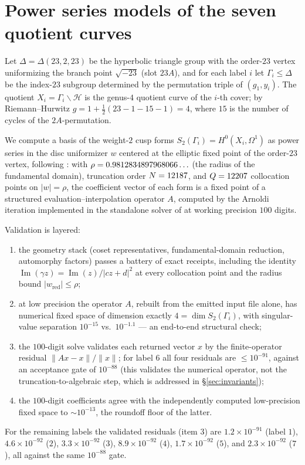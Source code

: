\documentclass[11pt]{amsart}
\newcommand{\sqm}{\sqrt{-23}}
\theoremstyle{plain}
\theoremstyle{definition}
\begin{document}
\section{Power series models of the seven quotient curves}
\label{sec:powser}

Let $\Delta=\Delta(23,2,23)$ be the hyperbolic triangle group with the
order-$23$ vertex uniformizing the branch point $\sqm$ (slot $23A$),
and for each label $i$ let $\Gamma_i\le\Delta$ be the index-$23$
subgroup determined by the permutation triple of $(g_1,y_i)$. The
quotient $X_i=\Gamma_i\backslash\mathcal{H}$ is the genus-$4$ quotient
curve of the $i$-th cover; by Riemann--Hurwitz
$g = 1+\tfrac{1}{2}(23-1-15-1)=4$, where $15$ is the number of cycles
of the $2A$-permutation.

We compute a basis of the weight-$2$ cusp forms
$S_2(\Gamma_i)=H^0(X_i,\Omega^1)$ as power series in the disc
uniformizer $w$ centered at the elliptic fixed point of the order-$23$
vertex, following \cite{KMSV,VoightWillis}: with
$\rho=0.9812834897968066\ldots$ (the radius of the fundamental domain),
truncation order $N=12187$, and $Q=12207$ collocation points on
$|w|=\rho$, the coefficient vector of each form is a fixed point of a
structured evaluation--interpolation operator $A$, computed by the
Arnoldi iteration implemented in the standalone solver of
\cite{BelyiRepo} at working precision $100$ digits.

Validation is layered:
\begin{enumerate}
\item the geometry stack (coset representatives, fundamental-domain
  reduction, automorphy factors) passes a battery of exact receipts,
  including the identity $\operatorname{Im}(\gamma z) =
  \operatorname{Im}(z)/|cz+d|^2$ at every collocation point and the
  radius bound $|w_{\mathrm{red}}|\le\rho$;
\item at low precision the operator $A$, rebuilt from the emitted
  input file alone, has numerical fixed space of dimension exactly
  $4=\dim S_2(\Gamma_i)$, with singular-value separation
  $10^{-15}$ vs.\ $10^{-1.1}$ --- an end-to-end structural check;
\item the $100$-digit solve validates each returned vector $x$ by
  the finite-operator residual $\|Ax-x\|/\|x\|$; for label $6$ all
  four residuals are $\le 10^{-91}$, against an acceptance gate of
  $10^{-88}$ (this validates the numerical operator, not the
  truncation-to-algebraic step, which is addressed in
  \S\ref{sec:invariants});
\item the $100$-digit coefficients agree with the independently
  computed low-precision fixed space to $\sim 10^{-13}$, the roundoff
  floor of the latter.
\end{enumerate}
For the remaining labels the validated residuals (item 3) are
$1.2\times10^{-91}$ (label $1$), $4.6\times10^{-92}$ ($2$),
$3.3\times10^{-92}$ ($3$), $8.9\times10^{-92}$ ($4$),
$1.7\times10^{-92}$ ($5$), and $2.3\times10^{-92}$ ($7$), all
against the same $10^{-88}$ gate.
\end{document}

